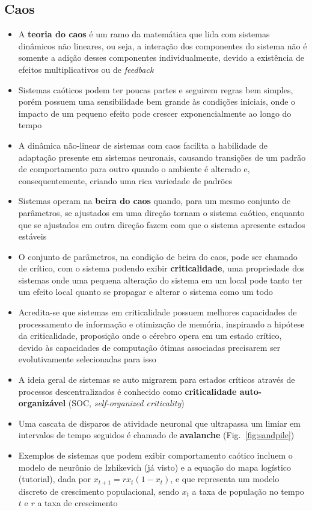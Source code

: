 \subsection{Caos}
\begin{itemize}
	\item A \textbf{teoria do caos} é um ramo da matemática que lida com sistemas dinâmicos não lineares, ou seja, a interação dos componentes do sistema não é somente a adição desses componentes individualmente, devido a existência de efeitos multiplicativos ou de \textit{feedback}
	\item Sistemas caóticos podem ter poucas partes e seguirem regras bem simples, porém possuem uma sensibilidade bem grande às condições iniciais, onde o impacto de um pequeno efeito pode crescer exponencialmente ao longo do tempo
	\item A dinâmica não-linear de sistemas com caos facilita a habilidade de adaptação presente em sistemas neuronais, causando transições de um padrão de comportamento para outro quando o ambiente é alterado e, consequentemente, criando uma rica variedade de padrões
	\item Sistemas operam na \textbf{beira do caos} quando, para um mesmo conjunto de parâmetros, se ajustados em uma direção tornam o sistema caótico, enquanto que se ajustados em outra direção fazem com que o sistema apresente estados estáveis
	\item O conjunto de parâmetros, na condição de beira do caos, pode ser chamado de crítico, com o sistema podendo exibir \textbf{criticalidade}, uma propriedade dos sistemas onde uma pequena alteração do sistema em um local pode tanto ter um efeito local quanto se propagar e alterar o sistema como um todo
	\item Acredita-se que sistemas em criticalidade possuem melhores capacidades de processamento de informação e otimização de memória, inspirando a hipótese da criticalidade, proposição onde o cérebro opera em um estado crítico, devido às capacidades de computação ótimas associadas precisarem ser evolutivamente selecionadas para isso
	\item A ideia geral de sistemas se auto migrarem para estados críticos através de processos descentralizados é conhecido como \textbf{criticalidade auto-organizável} (SOC, \textit{self-organized criticality})
	\item Uma cascata de disparos de atividade neuronal que ultrapassa um limiar em intervalos de tempo seguidos é chamado de \textbf{avalanche} (Fig.~\ref*{fig:sandpile})
	\item Exemplos de sistemas que podem exibir comportamento caótico incluem o modelo de neurônio de Izhikevich (já visto) e a equação do mapa logístico (tutorial), dada por $x_{t+1}=rx_t(1-x_t)$, e que representa um modelo discreto de crescimento populacional, sendo $x_t$ a taxa de população no tempo $t$ e $r$ a taxa de crescimento
\end{itemize}

